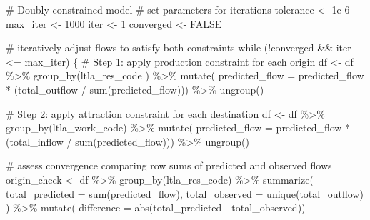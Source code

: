 \documentclass[
  a4paper, 
  twoside,
  final
]{article}
\newenvironment{Shaded}{\begin{snugshade}}{\end{snugshade}}
\newcommand{\AttributeTok}[1]{\textcolor[rgb]{0.40,0.45,0.13}{#1}}
\newcommand{\CommentTok}[1]{\textcolor[rgb]{0.37,0.37,0.37}{#1}}
\newcommand{\ConstantTok}[1]{\textcolor[rgb]{0.56,0.35,0.01}{#1}}
\newcommand{\ControlFlowTok}[1]{\textcolor[rgb]{0.00,0.23,0.31}{#1}}
\newcommand{\DecValTok}[1]{\textcolor[rgb]{0.68,0.00,0.00}{#1}}
\newcommand{\FloatTok}[1]{\textcolor[rgb]{0.68,0.00,0.00}{#1}}
\newcommand{\FunctionTok}[1]{\textcolor[rgb]{0.28,0.35,0.67}{#1}}
\newcommand{\NormalTok}[1]{\textcolor[rgb]{0.00,0.23,0.31}{#1}}
\newcommand{\OtherTok}[1]{\textcolor[rgb]{0.00,0.23,0.31}{#1}}
\newcommand{\SpecialCharTok}[1]{\textcolor[rgb]{0.37,0.37,0.37}{#1}}
\newcounter{code}
\begin{document}
\begin{Shaded}
\begin{Highlighting}[]
\CommentTok{\# Doubly{-}constrained model}
\CommentTok{\# set parameters for iterations}
\NormalTok{tolerance }\OtherTok{\textless{}{-}} \FloatTok{1e{-}6}
\NormalTok{max\_iter }\OtherTok{\textless{}{-}} \DecValTok{1000}
\NormalTok{iter }\OtherTok{\textless{}{-}} \DecValTok{1}
\NormalTok{converged }\OtherTok{\textless{}{-}} \ConstantTok{FALSE}

\CommentTok{\# iteratively adjust flows to satisfy both constraints}
\ControlFlowTok{while}\NormalTok{ (}\SpecialCharTok{!}\NormalTok{converged }\SpecialCharTok{\&\&}\NormalTok{ iter }\SpecialCharTok{\textless{}=}\NormalTok{ max\_iter) \{}
  \CommentTok{\# Step 1: apply production constraint for each origin}
\NormalTok{  df }\OtherTok{\textless{}{-}}\NormalTok{ df }\SpecialCharTok{\%\textgreater{}\%}
    \FunctionTok{group\_by}\NormalTok{(ltla\_res\_code ) }\SpecialCharTok{\%\textgreater{}\%}
    \FunctionTok{mutate}\NormalTok{(}
      \AttributeTok{predicted\_flow =} 
\NormalTok{        predicted\_flow }\SpecialCharTok{*}\NormalTok{ (total\_outflow }\SpecialCharTok{/} \FunctionTok{sum}\NormalTok{(predicted\_flow))) }\SpecialCharTok{\%\textgreater{}\%}
    \FunctionTok{ungroup}\NormalTok{()}
  
  \CommentTok{\# Step 2: apply attraction constraint for each destination}
\NormalTok{  df }\OtherTok{\textless{}{-}}\NormalTok{ df }\SpecialCharTok{\%\textgreater{}\%}
    \FunctionTok{group\_by}\NormalTok{(ltla\_work\_code) }\SpecialCharTok{\%\textgreater{}\%}
    \FunctionTok{mutate}\NormalTok{(}
      \AttributeTok{predicted\_flow =} 
\NormalTok{        predicted\_flow }\SpecialCharTok{*}\NormalTok{ (total\_inflow }\SpecialCharTok{/} \FunctionTok{sum}\NormalTok{(predicted\_flow))) }\SpecialCharTok{\%\textgreater{}\%}
    \FunctionTok{ungroup}\NormalTok{()}

  \CommentTok{\# assess convergence comparing row sums of predicted and observed flows}
\NormalTok{  origin\_check }\OtherTok{\textless{}{-}}\NormalTok{ df }\SpecialCharTok{\%\textgreater{}\%}
    \FunctionTok{group\_by}\NormalTok{(ltla\_res\_code) }\SpecialCharTok{\%\textgreater{}\%}
    \FunctionTok{summarize}\NormalTok{(}
      \AttributeTok{total\_predicted =} 
        \FunctionTok{sum}\NormalTok{(predicted\_flow), }\AttributeTok{total\_observed =} \FunctionTok{unique}\NormalTok{(total\_outflow)}
\NormalTok{      ) }\SpecialCharTok{\%\textgreater{}\%}
    \FunctionTok{mutate}\NormalTok{(}
      \AttributeTok{difference =} 
        \FunctionTok{abs}\NormalTok{(total\_predicted }\SpecialCharTok{{-}}\NormalTok{ total\_observed))}


\end{Highlighting}
\end{Shaded}
\end{document}
